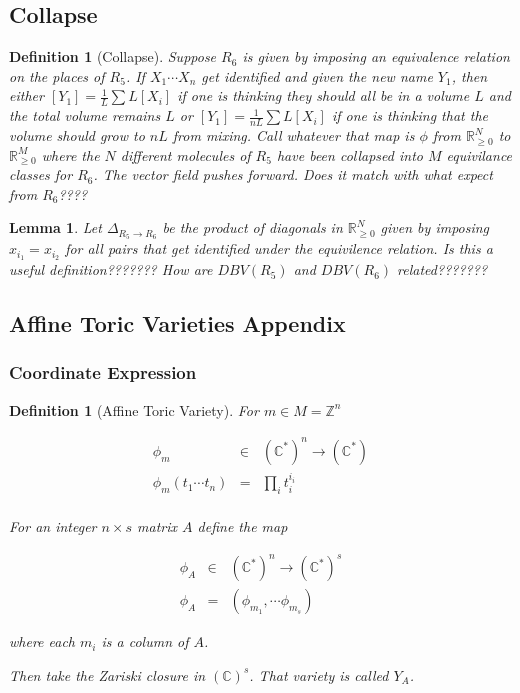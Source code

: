 \documentclass[11pt]{book}
\theoremstyle{change}
\newtheorem{definition}[equation]{Definition}
\newtheorem{lemma}[equation]{Lemma}
\theoremstyle{nonumberplain}
\numberwithin{equation}{section}
\begin{document}
\subsection{Collapse}

\begin{definition}[Collapse]
Suppose $R_6$ is given by imposing an equivalence relation on the places of $R_5$. If $X_1 \cdots X_n$ get identified and given the new name $Y_1$, then either $[Y_1] = \frac{1}{L} \sum L [X_i]$ if one is thinking they should all be in a volume $L$ and the total volume remains $L$ or $[Y_1] = \frac{1}{nL} \sum L [X_i]$ if one is thinking that the volume should grow to $nL$ from mixing. Call whatever that map is $\phi$ from $\mathbb{R}_{\geq 0}^N$ to $\mathbb{R}_{\geq 0}^{M}$ where the $N$ different molecules of $R_5$ have been collapsed into $M$ equivilance classes for $R_6$. The vector field pushes forward. Does it match with what expect from $R_6$????
\end{definition}

\begin{lemma}
Let $\Delta_{R_5 \to R_6}$ be the product of diagonals in $\mathbb{R}_{\geq 0}^N$ given by imposing $x_{i_1} = x_{i_2}$ for all pairs that get identified under the equivilence relation. Is this a useful definition???????
How are $DBV(R_5)$ and $DBV(R_6)$ related???????
\end{lemma}



\subsection{Affine Toric Varieties Appendix}

\subsubsection{Coordinate Expression}

\begin{definition}[Affine Toric Variety]

For $m \in M = \mathbb{Z}^n$

\begin{eqnarray*}
\phi_m  &\in& (\mathbb{C}^*)^n \to (\mathbb{C}^*)\\
\phi_m (t_1 \cdots t_n) &=& \prod_i t_i^{i_i}\\
\end{eqnarray*}

For an integer $n \times s$ matrix $A$ define the map

\begin{eqnarray*}
\phi_A &\in& (\mathbb{C}^*)^n \to (\mathbb{C}^*)^s\\
\phi_A &=& (\phi_{m_1}, \cdots \phi_{m_s})
\end{eqnarray*}

where each $m_i$ is a column of $A$.

Then take the Zariski closure in $(\mathbb{C})^s$. That variety is called $Y_A$.

\end{definition}
\end{document}
